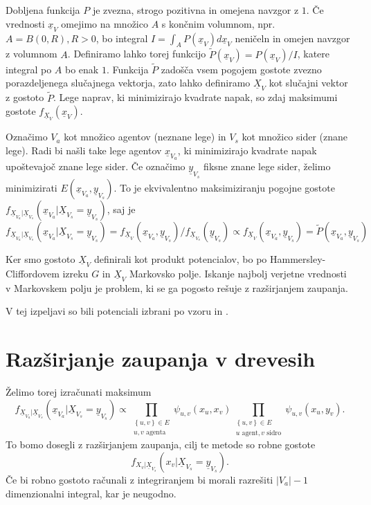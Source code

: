 \documentclass[a4paper]{article}
\begin{document}
	Dobljena funkcija $P$ je zvezna, strogo pozitivna in omejena navzgor z $1$.
	Če vrednosti $\underline{x}_V$ omejimo na množico $A$ s končnim volumnom,
	npr.\ $A = B\left(0, R\right), R>0$, bo integral
	$I = \int_{A}P\left(\underline{x}_V\right)d\underline{x}_V$ neničeln in omejen
	navzgor z volumnom $A$. Definiramo lahko torej funkcijo
	$\tilde{P}\left(\underline{x}_V\right) = P\left(\underline{x}_V\right) / I$,
	katere integral po $A$ bo enak $1$. Funkcija $\tilde{P}$ zadošča vsem pogojem
	gostote zvezno porazdeljenega slučajnega vektorja, zato lahko definiramo
	$\underline{X}_V$ kot slučajni vektor z gostoto $\tilde{P}$. Lege naprav,
	ki minimizirajo kvadrate napak, so zdaj maksimumi gostote
	$f_{\underline{X}_V}\left(\underline{x}_V\right)$.

	Označimo $V_a$ kot množico agentov (neznane lege) in $V_s$ kot
	množico sider (znane lege). Radi bi našli take lege agentov
	$\underline{x}_{V_a}$, ki minimizirajo kvadrate napak upoštevajoč znane
	lege sider. Če označimo $\underline{y}_{V_s}$ fiksne znane lege sider, želimo
	minimizirati $E\left(\underline{x}_{V_a}, \underline{y}_{V_s}\right)$. To
	je ekvivalentno maksimiziranju pogojne gostote
	$f_{\underline{X}_{V_a}|\underline{X}_{V_s}}\left(\underline{x}_{V_a} | \underline{X}_{V_s}=\underline{y}_{V_s}\right)$,
	saj je
	$$f_{\underline{X}_{V_a}|\underline{X}_{V_s}}\left(\underline{x}_{V_a} | \underline{X}_{V_s}=\underline{y}_{V_s}\right) =
	f_{\underline{X}_{V}}\left(\underline{x}_{V_a}, \underline{y}_{V_s}\right)/f_{\underline{X}_{V_s}}\left(\underline{y}_{V_s}\right) \propto
	f_{\underline{X}_{V}}\left(\underline{x}_{V_a}, \underline{y}_{V_s}\right) =
	\tilde{P}\left(\underline{x}_{V_a}, \underline{y}_{V_s}\right)
	$$

	Ker smo gostoto $\underline{X}_V$ definirali kot produkt potencialov, bo po
	Hammersley-Cliffordovem izreku $G$ in $\underline{X}_V$ Markovsko polje.
	Iskanje najbolj verjetne vrednosti v Markovskem polju je problem,
	ki se ga pogosto rešuje z razširjanjem zaupanja.

	V tej izpeljavi so bili potenciali izbrani po vzoru \cite{chapter26} in \cite{mitdiploma}.

	\section{Razširjanje zaupanja v drevesih}
	Želimo torej izračunati maksimum
	$$
	f_{\underline{X}_{V_a} | \underline{X}_{V_s}}\left(\underline{x}_{V_a} | \underline{X}_{V_s} = \underline{y}_{V_s}\right) \propto
	\prod_{\substack{\left\{u,v\right\} \in E \\ u,v \text{ agenta}}}\psi_{u,v}\left(x_u,x_v\right)
	\prod_{\substack{\left\{u,v\right\} \in E \\ u\text{ agent}, v \text{ sidro}}}\psi_{u,v}\left(x_u,y_v\right).
	$$
	To bomo dosegli z razširjanjem zaupanja, cilj te metode so robne gostote
	$$
	f_{X_v | \underline{X}_{V_s}}\left(x_v | \underline{X}_{V_s} = \underline{y}_{V_s}\right).
	$$
	Če bi robno gostoto računali z integriranjem bi morali razrešiti
	$\left|V_a\right|-1$ dimenzionalni integral, kar je neugodno.
\end{document}
